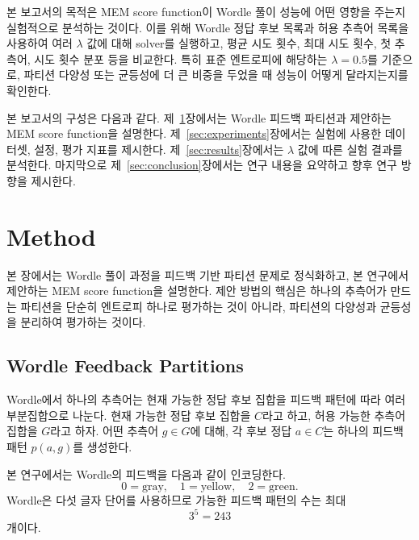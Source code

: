 \documentclass[11pt]{article}
\begin{document}
본 보고서의 목적은 MEM score function이 Wordle 풀이 성능에 어떤 영향을 주는지 실험적으로 분석하는 것이다.
이를 위해 Wordle 정답 후보 목록과 허용 추측어 목록을 사용하여 여러 $\lambda$ 값에 대해 solver를 실행하고, 평균 시도 횟수, 최대 시도 횟수, 첫 추측어, 시도 횟수 분포 등을 비교한다.
특히 표준 엔트로피에 해당하는 $\lambda = 0.5$를 기준으로, 파티션 다양성 또는 균등성에 더 큰 비중을 두었을 때 성능이 어떻게 달라지는지를 확인한다.

본 보고서의 구성은 다음과 같다.
제~\ref{sec:method}장에서는 Wordle 피드백 파티션과 제안하는 MEM score function을 설명한다.
제~\ref{sec:experiments}장에서는 실험에 사용한 데이터셋, 설정, 평가 지표를 제시한다.
제~\ref{sec:results}장에서는 $\lambda$ 값에 따른 실험 결과를 분석한다.
마지막으로 제~\ref{sec:conclusion}장에서는 연구 내용을 요약하고 향후 연구 방향을 제시한다.



















\section{Method}
\label{sec:method}


본 장에서는 Wordle 풀이 과정을 피드백 기반 파티션 문제로 정식화하고, 본 연구에서 제안하는 MEM score function을 설명한다.
제안 방법의 핵심은 하나의 추측어가 만드는 파티션을 단순히 엔트로피 하나로 평가하는 것이 아니라, 파티션의 다양성과 균등성을 분리하여 평가하는 것이다.

\subsection{Wordle Feedback Partitions}

Wordle에서 하나의 추측어는 현재 가능한 정답 후보 집합을 피드백 패턴에 따라 여러 부분집합으로 나눈다.
현재 가능한 정답 후보 집합을 $C$라고 하고, 허용 가능한 추측어 집합을 $G$라고 하자.
어떤 추측어 $g \in G$에 대해, 각 후보 정답 $a \in C$는 하나의 피드백 패턴 $p(a,g)$를 생성한다.

본 연구에서는 Wordle의 피드백을 다음과 같이 인코딩한다.
\[
0 = \text{gray}, \quad
1 = \text{yellow}, \quad
2 = \text{green}.
\]
Wordle은 다섯 글자 단어를 사용하므로 가능한 피드백 패턴의 수는 최대
\[
3^5 = 243
\]
개이다.
\end{document}
